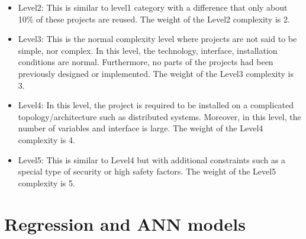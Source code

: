 \documentclass[8pt]{article}
\begin{document}
{\begin{itemize}
\item Level2: This is similar to level1 category with a difference that only about 10\% of these projects are reused. The weight of the Level2 complexity is 2.
\item Level3: This is the normal complexity level where projects are not said to be simple, nor complex. In this level, the technology, interface, installation conditions are normal. Furthermore, no parts of the projects had been previously
designed or implemented. The weight of the Level3 complexity is 3.
\item Level4: In this level, the project is required to be installed on a complicated topology/architecture such as distributed systems. Moreover, in this level, the number of variables and interface is large. The weight of the Level4 complexity is 4.
\item Level5: This is similar to Level4 but with additional constraints such as a special type of security or high safety factors. The weight of the Level5 complexity is 5.
\end{itemize}
\section{Regression and ANN models}
\label{sec5}
}
\end{document}
